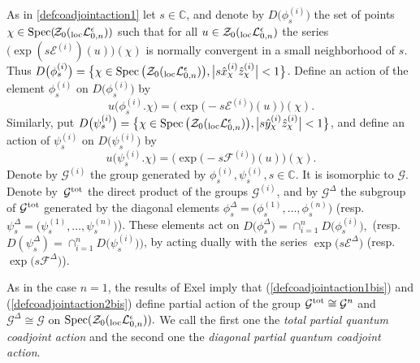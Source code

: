 \documentclass[pdftex]{sigma}%
\numberwithin{equation}{section}
\numberwithin{figure}{section}
\newcommand{\Ll}{{\mathcal L}}
\begin{document}
As in \eqref{defcoadjointaction1} let $s\in {\mathbb C}$, and denote by $D\big(\phi_s^{(i)}\big)$ the set of points $\chi\in \operatorname{Spec}(\!{\mathcal{Z}}_0({}_{\rm loc}\Ll_{0,n}^\epsilon))$ such that for all $u\in {\mathcal{Z}}_0({}_{\rm loc}\Ll_{0,n}^\epsilon)$ the series $\big(\!\exp(s{\mathcal E}^{(i)})(u)\big)(\chi)$ is normally convergent in a small neighborhood of $s$. Thus $D\big(\phi_s^{(i)}\big)=\big\{\chi\in \operatorname{Spec}\big({\mathcal{Z}}_0({}_{\rm loc}\Ll_{0,n}^\epsilon)\big), \big\vert s \hat{x}^{(i)}_\chi \hat{z}^{(i)}_\chi\big\vert <1\big\}$. Define an action of the element $\phi_s^{(i)}$ on $D\big(\phi_s^{(i)}\big)$ by
\begin{equation}\label{defcoadjointaction1bis}
u\big(\phi_s^{(i)}.\chi\big) = \big(\!\exp\big({-}s{\mathcal E}^{(i)}\big)(u)\big)(\chi).
\end{equation}
Similarly, put $D\big(\psi_s^{(i)}\big)=\big\{\chi\in \operatorname{Spec}\big({\mathcal{Z}}_0({}_{\rm loc}\Ll_{0,n}^\epsilon)\big), \big\vert s \hat{y}^{(i)}_\chi \hat{z}^{(i)}_\chi\big\vert <1\big\}$, and define an action of
$\psi_s^{(i)}$ on $D\big(\psi_s^{(i)}\big)$ by
\begin{equation}\label{defcoadjointaction2bis}
u\big(\psi_s^{(i)}.\chi\big) = \big(\!\exp\big({-}s{\mathcal F}^{(i)}\big)(u)\big)(\chi).
\end{equation}
Denote by ${\mathcal G}^{(i)}$ the group generated by $\phi_s^{(i)}, \psi_s^{(i)}, s\in {\mathbb C}$. It is isomorphic to ${\mathcal G}$. Denote by~${\mathcal G}^{\rm tot}$ the direct product of the groups ${\mathcal G}^{(i)}$, and by ${\mathcal G}^{\Delta}$ the subgroup of ${\mathcal G}^{\rm tot}$ generated by the dia\-go\-nal elements $\phi_s^{\Delta}=\big(\phi_s^{(1)},\dots,\phi_s^{(n)}\big)$ \big(resp.~$\psi_s^{\Delta}=\big(\psi_s^{(1)},\dots,\psi_s^{(n)}\big)$\big). These elements act on $D\big(\phi_s^{\Delta}\big)=\cap_{i=1}^n D\big(\phi_s^{(i)}\big), $ \big(resp.~$D(\psi_s^{\Delta})=\cap_{i=1}^n D\big(\psi_s^{(i)}\big) \big)$, by acting dually with the series $\exp\big(s{\mathcal E}^{\Delta}\big)$
\big(resp.~$\exp\big(s{\mathcal F}^{\Delta}\big)$\big).

As in the case $n=1$, the results of Exel \cite{Ex1, Ex2} imply that (\ref{defcoadjointaction1bis}) and (\ref{defcoadjointaction2bis}) define partial action of the group ${\mathcal G}^{\rm tot}\cong {\mathcal G}^n$ and ${\mathcal G}^{\Delta}\cong {\mathcal G}$ on $\operatorname{Spec}({\mathcal{Z}}_0({}_{\rm loc}\Ll_{0,n}^\epsilon)).$ We call the first one the {\it total partial quantum coadjoint action} and the second one the {\it diagonal partial quantum coadjoint action}.
\end{document}
